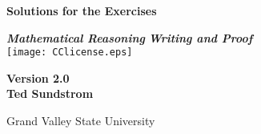\begin{titlepage}
\vspace*{0.5in}
\begin{center}
\fontsize{28.8}{12}\selectfont \textbf{Solutions for the Exercises}

\fontsize{28.8}{12}\selectfont \emph{\textbf{Mathematical Reasoning}}
\smallskip
\fontsize{23}{12}\selectfont \emph{\textbf{Writing and Proof}}\\
\vspace{0.3125in}
\texttt{[image: CClicense.eps]}

\vspace{0.3in}
\textbf{\large{Version 2.0}} \\

\vspace{1.0in}
\textbf{\huge{Ted Sundstrom}}



\smallskip
\Large{Grand Valley State University}
\end{center}


\end{titlepage}


\endinput
